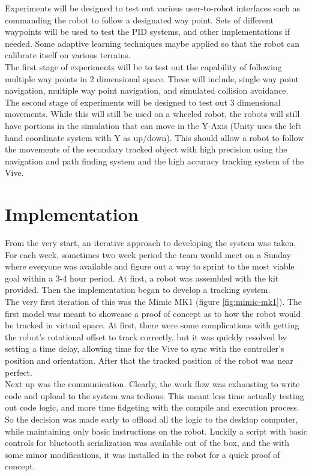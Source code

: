 \documentclass[10pt,a4paper]{article}
\begin{document}
	Experiments will be designed to test out various user-to-robot interfaces such as commanding the robot to follow a designated way point. Sets of different waypoints will be used to test the PID systems, and other implementations if needed. Some adaptive learning techniques maybe applied so that the robot can calibrate itself on various terrains.
	\\ 
	The first stage of experiments will be to test out the capability of following multiple way points in 2 dimensional space. These will include, single way point navigation, multiple way point navigation, and simulated collision avoidance.
	\\ 
	The second stage of experiments will be designed to test out 3 dimensional movements. While this will still be used on a wheeled robot, the robots will still have portions in the simulation that can move in the Y-Axis (Unity uses the left hand coordinate system with Y as up/down). This should allow a robot to follow the movements of the secondary tracked object with high precision using the navigation and path finding system and the high accuracy tracking system of the Vive.
	
	\section{Implementation}
	From the very start, an iterative approach to developing the system was taken. For each week, sometimes two week period the team would meet on a Sunday where everyone was available and figure out a way to sprint to the most viable goal within a 3-4 hour period. At first, a robot was assembled with the kit provided. Then the implementation began to develop a tracking system.
	\\
	The very first iteration of this was the Mimic MK1 (figure \ref{fig:mimic-mk1}). The first model was meant to showcase a proof of concept as to how the robot would be tracked in virtual space. At first, there were some complications with getting the robot's rotational offset to track correctly, but it was quickly resolved by setting a time delay, allowing time for the Vive to sync with the controller's position and orientation. After that the tracked position of the robot was near perfect.
	\\
	Next up was the communication. Clearly, the work flow was exhausting to write code and upload to the system was tedious. This meant less time actually testing out code logic, and more time fidgeting with the compile and execution process. So the decision was made early to offload all the logic to the desktop computer, while maintaining only basic instructions on the robot. Luckily a script with basic controls for bluetooth serialization was available out of the box, and the with some minor modifications, it was installed in the robot for a quick proof of concept.
		
\end{document}
